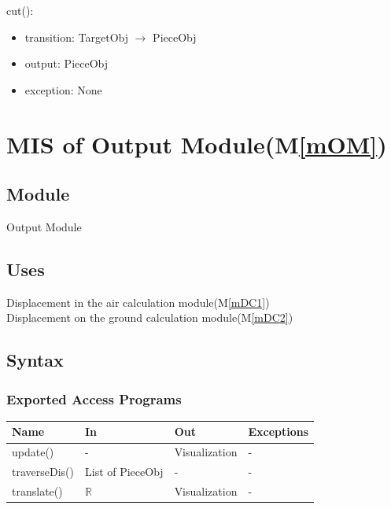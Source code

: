 \documentclass[12pt, titlepage]{article}
\newcommand{\mref}[1]{M\ref{#1}}
\begin{document}
\noindent cut():
\begin{itemize}
	\item transition:  TargetObj $\rightarrow$ PieceObj
	\item output: PieceObj 
	\item exception: None 
\end{itemize}

\section{MIS of Output Module(\mref{mOM})}


\subsection{Module}

Output Module

\subsection{Uses}

Displacement in the air calculation module(\mref{mDC1})\\
Displacement on the ground calculation module(\mref{mDC2})\\

\subsection{Syntax}

\subsubsection{Exported Access Programs}

\begin{center}
	\begin{tabular}{p{2cm} p{4cm} p{4cm} p{2cm}}
		\hline
		\textbf{Name} & \textbf{In} & \textbf{Out} & \textbf{Exceptions} \\
		\hline
		update() & - & Visualization & - \\
		traverseDis() & List of PieceObj & - & - \\
		translate() & $\mathbb{R}$ & Visualization & - \\
		\hline
	\end{tabular}
\end{center}
\end{document}
